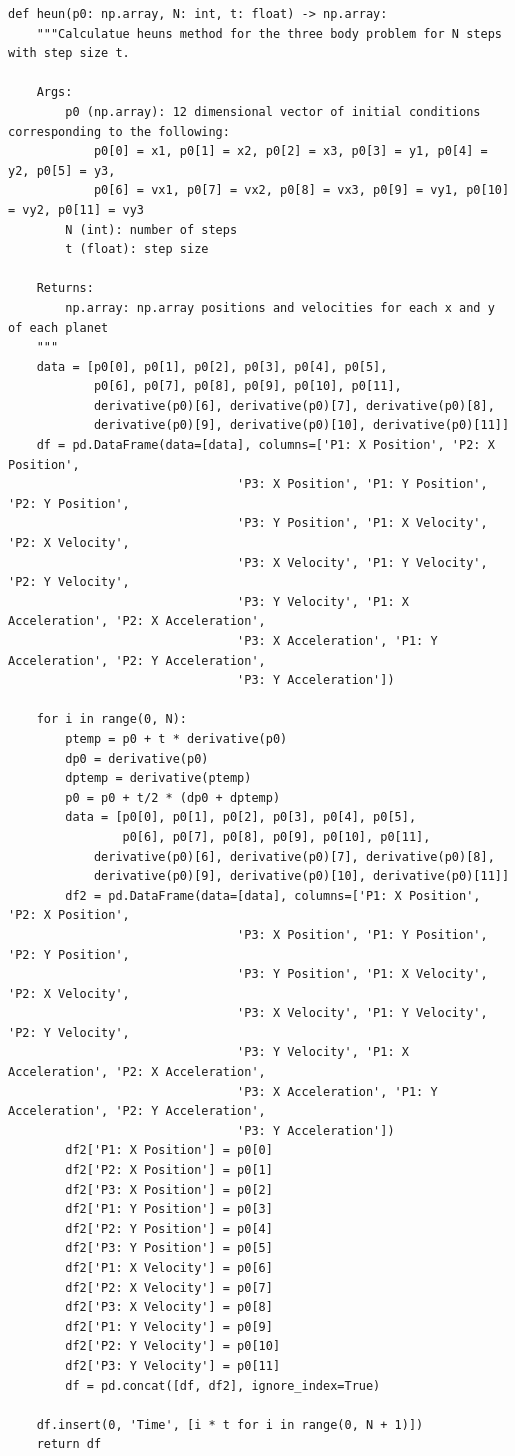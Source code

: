 \documentclass{article}
\begin{document}
\begin{verbatim}
def heun(p0: np.array, N: int, t: float) -> np.array:
    """Calculatue heuns method for the three body problem for N steps with step size t.

    Args:
        p0 (np.array): 12 dimensional vector of initial conditions corresponding to the following:
            p0[0] = x1, p0[1] = x2, p0[2] = x3, p0[3] = y1, p0[4] = y2, p0[5] = y3, 
            p0[6] = vx1, p0[7] = vx2, p0[8] = vx3, p0[9] = vy1, p0[10] = vy2, p0[11] = vy3
        N (int): number of steps
        t (float): step size

    Returns:
        np.array: np.array positions and velocities for each x and y of each planet
    """
    data = [p0[0], p0[1], p0[2], p0[3], p0[4], p0[5], 
            p0[6], p0[7], p0[8], p0[9], p0[10], p0[11], 
            derivative(p0)[6], derivative(p0)[7], derivative(p0)[8], 
            derivative(p0)[9], derivative(p0)[10], derivative(p0)[11]]
    df = pd.DataFrame(data=[data], columns=['P1: X Position', 'P2: X Position', 
                                'P3: X Position', 'P1: Y Position', 'P2: Y Position', 
                                'P3: Y Position', 'P1: X Velocity', 'P2: X Velocity', 
                                'P3: X Velocity', 'P1: Y Velocity', 'P2: Y Velocity', 
                                'P3: Y Velocity', 'P1: X Acceleration', 'P2: X Acceleration', 
                                'P3: X Acceleration', 'P1: Y Acceleration', 'P2: Y Acceleration', 
                                'P3: Y Acceleration'])

    for i in range(0, N):
        ptemp = p0 + t * derivative(p0)
        dp0 = derivative(p0)
        dptemp = derivative(ptemp)
        p0 = p0 + t/2 * (dp0 + dptemp)
        data = [p0[0], p0[1], p0[2], p0[3], p0[4], p0[5], 
                p0[6], p0[7], p0[8], p0[9], p0[10], p0[11], 
            derivative(p0)[6], derivative(p0)[7], derivative(p0)[8], 
            derivative(p0)[9], derivative(p0)[10], derivative(p0)[11]]
        df2 = pd.DataFrame(data=[data], columns=['P1: X Position', 'P2: X Position', 
                                'P3: X Position', 'P1: Y Position', 'P2: Y Position', 
                                'P3: Y Position', 'P1: X Velocity', 'P2: X Velocity', 
                                'P3: X Velocity', 'P1: Y Velocity', 'P2: Y Velocity', 
                                'P3: Y Velocity', 'P1: X Acceleration', 'P2: X Acceleration', 
                                'P3: X Acceleration', 'P1: Y Acceleration', 'P2: Y Acceleration', 
                                'P3: Y Acceleration'])
        df2['P1: X Position'] = p0[0]
        df2['P2: X Position'] = p0[1]
        df2['P3: X Position'] = p0[2]
        df2['P1: Y Position'] = p0[3]
        df2['P2: Y Position'] = p0[4]
        df2['P3: Y Position'] = p0[5]
        df2['P1: X Velocity'] = p0[6]
        df2['P2: X Velocity'] = p0[7]
        df2['P3: X Velocity'] = p0[8]
        df2['P1: Y Velocity'] = p0[9]
        df2['P2: Y Velocity'] = p0[10]
        df2['P3: Y Velocity'] = p0[11]
        df = pd.concat([df, df2], ignore_index=True)
    
    df.insert(0, 'Time', [i * t for i in range(0, N + 1)])
    return df
\end{verbatim}
\end{document}
